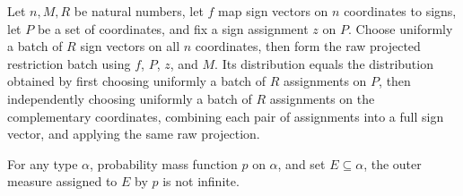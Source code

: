 \begin{theorem}
\label{FABL.map_uniformPMF_rawProjectedJuntaRestrictionBatch}
\leanok
{}
Let $n,M,R$ be natural numbers, let $f$ map sign vectors on $n$ coordinates to signs,
let $P$ be a set of coordinates, and fix a sign assignment $z$ on $P$. Choose uniformly
a batch of $R$ sign vectors on all $n$ coordinates, then form the raw projected
restriction batch using $f$, $P$, $z$, and $M$. Its distribution equals the distribution
obtained by first choosing uniformly a batch of $R$ assignments on $P$, then
independently choosing uniformly a batch of $R$ assignments on the complementary
coordinates, combining each pair of assignments into a full sign vector, and applying
the same raw projection.
\end{theorem}

\begin{theorem}
\label{FABL.pmfToOuterMeasure_ne_top}
\leanok
{}
For any type $\alpha$, probability mass function $p$ on $\alpha$, and set
$E\subseteq\alpha$, the outer measure assigned to $E$ by $p$ is not infinite.
\end{theorem}

